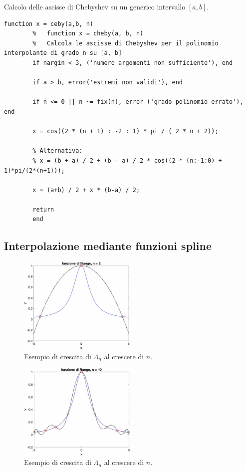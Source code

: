 \begin{algorithm}\caption{Calcolo delle ascisse di Chebyshev su un generico intervallo $[a, b]$.}
	\label{alg:cheby}
	\begin{lstlisting}[style=Matlab-editor]
		function x = ceby(a,b, n)
		%	function x = cheby(a, b, n)
		%	Calcola le ascisse di Chebyshev per il polinomio interpolante di grado n su [a, b]
		if nargin < 3, ('numero argomenti non sufficiente'), end
		
		if a > b, error('estremi non validi'), end
		
		if n <= 0 || n ~= fix(n), error ('grado polinomio errato'), end
		
		x = cos((2 * (n + 1) : -2 : 1) * pi / ( 2 * n + 2));
		
		% Alternativa:
		% x = (b + a) / 2 + (b - a) / 2 * cos((2 * (n:-1:0) + 1)*pi/(2*(n+1)));
		
		x = (a+b) / 2 + x * (b-a) / 2;
		
		return 
		end
	\end{lstlisting}
\end{algorithm}

\subsection{Interpolazione mediante funzioni spline}

\begin{figure}
	\centering
	\includegraphics[width=0.5\textwidth]{immagini/funzione_runge_ascisse_cheby_n=2.jpg}
	\caption{Esempio di crescita di $\Lambda_n$ al crescere di $n$.}\label{fig:funzione_runge_ascisse_cheby_n=2}
\end{figure}

\begin{figure}
	\centering
	\includegraphics[width=0.5\textwidth]{immagini/funzione_runge_ascisse_cheby_n=10.jpg}
	\caption{Esempio di crescita di $\Lambda_n$ al crescere di $n$.}\label{fig:funzione_runge_ascisse_cheby_n=10}
\end{figure}

